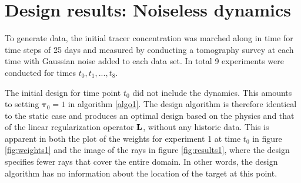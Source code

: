 \documentclass[11pt]{article}
\newcommand{\bfL}	{{\bf{L}}}
\newcommand{\bftau}      {{\boldsymbol \tau}}
\begin{document}
\section{Design results: Noiseless dynamics}
\label{sec:Results}
To generate data, the initial tracer concentration was marched along in time for time steps of 25 days and measured by conducting a tomography survey at each time with Gaussian noise added to each data set. In total 9 experiments were conducted for times $t_0,t_1,...,t_8$. 



The initial design for time point $t_0$ did not include the dynamics. This amounts to  setting $\bftau_0 = 1$ in algorithm \ref{algo1}. The design algorithm is therefore identical to the static case and produces an optimal design based on the physics and that of the linear regularization operator $\bfL$, without any historic data. This is apparent in both the plot of the weights for experiment 1 at time  $t_0$ in figure \ref{fig:weights1} and the image of the rays in figure \ref{fig:results1}, where the design specifies fewer rays that cover the entire domain. In other words, the design algorithm has no information about the location of the target at this point. 
\end{document}
